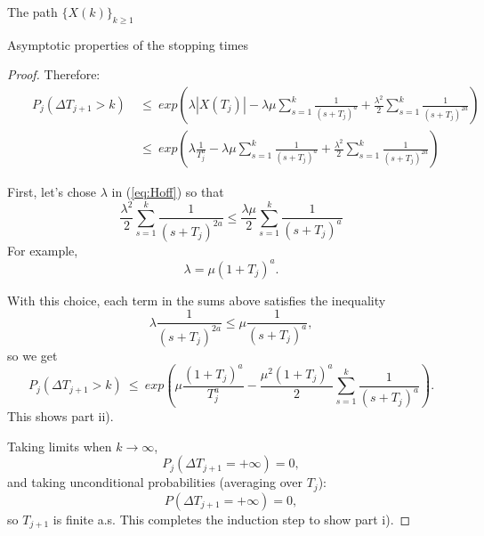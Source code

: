 \documentclass[12pt]{article}
\begin{document}
\begin{section}{The path $\{X(k)\}_{k\ge1}$ }
\begin{subsection}{Asymptotic properties of the stopping times}
\begin{proof}
Therefore:
\begin{align} \label{eq:Hoff}
&& P_j\left( \Delta T_{j+1} > k \right) &~\le~
exp\left( 
\lambda |X(T_{j})| 
-\lambda \mu \sum_{s=1}^{k} \frac{1}{{(s+T_j)}^a}  +
 \frac{\lambda^2}{2} \sum_{s=1}^{k}\frac{1}{{(s+T_j)}^{2a} }  \right) \nonumber \\
&& &~\le~
 exp\left( 
 \lambda \frac{1}{T_j^a} 
 -\lambda \mu \sum_{s=1}^{k} \frac{1}{{(s+T_j)}^a}  +
 \frac{\lambda^2}{2} \sum_{s=1}^{k}\frac{1}{{(s+T_j)}^{2a} }  \right)
\end{align}

First, let's chose $\lambda$ in (\ref{eq:Hoff}) so that 
$$
\frac{\lambda^2}{2} \sum_{s=1}^{k}\frac{1}{{(s+T_j)}^{2a} } \le 
\frac{\lambda \mu}{2} \sum_{s=1}^{k} \frac{1}{{(s+T_j)}^a}  
$$
For example, 
\begin{equation}
\lambda = \mu (1+T_j)^a .
\end{equation}


With this choice, each term in the sums above satisfies the inequality
$$
\lambda \frac{1}{{(s+T_j)}^{2a} } \le \mu \frac{1}{{(s+T_j)}^a}  ,
$$
so we get
\begin{equation} \label{eq:Hoff2}
 P_j\left( \Delta T_{j+1} > k \right) ~\le~
exp\left( 
\mu  \frac{(1+T_j)^a}{T_j^a} 
- \frac{\mu^2 (1+T_j)^a}{2} \sum_{s=1}^{k} \frac{1}{{(s+T_j)}^a}  \right).
\end{equation} This shows part ii).  


Taking limits when $k \rightarrow \infty$,
\begin{equation} 
P_j( \Delta T_{j+1} =+\infty ) = 0,
\end{equation}
and taking unconditional probabilities (averaging over $T_j$):
\begin{equation} 
P( \Delta T_{j+1} =+\infty ) = 0,
\end{equation} 
so $T_{j+1}$ is finite a.s. This completes the induction step to show part i).



\end{proof}
\end{subsection}
\end{section}
\end{document}
